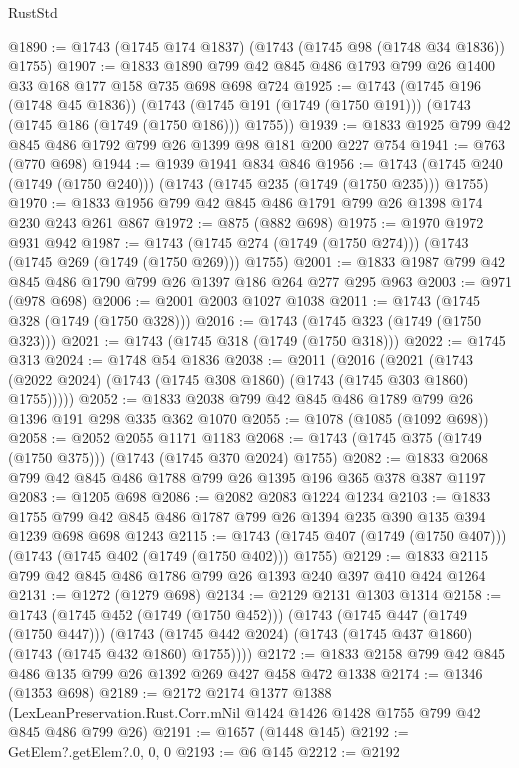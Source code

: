 \begin{lexlean}{RustStd}
\begin{coremodule}
@1890 := @1743 (@1745 @174 @1837) (@1743 (@1745 @98 (@1748 @34 @1836)) @1755)
@1907 := @1833 @1890 @799 @42 @845 @486 @1793 @799 @26 @1400 @33 @168 @177 @158 @735 @698 @698 @724
@1925 := @1743
    (@1745 @196 (@1748 @45 @1836))
    (@1743 (@1745 @191 (@1749 (@1750 @191))) (@1743 (@1745 @186 (@1749 (@1750 @186))) @1755))
@1939 := @1833 @1925 @799 @42 @845 @486 @1792 @799 @26 @1399 @98 @181 @200 @227 @754
@1941 := @763 (@770 @698)
@1944 := @1939 @1941 @834 @846
@1956 := @1743 (@1745 @240 (@1749 (@1750 @240))) (@1743 (@1745 @235 (@1749 (@1750 @235))) @1755)
@1970 := @1833 @1956 @799 @42 @845 @486 @1791 @799 @26 @1398 @174 @230 @243 @261 @867
@1972 := @875 (@882 @698)
@1975 := @1970 @1972 @931 @942
@1987 := @1743 (@1745 @274 (@1749 (@1750 @274))) (@1743 (@1745 @269 (@1749 (@1750 @269))) @1755)
@2001 := @1833 @1987 @799 @42 @845 @486 @1790 @799 @26 @1397 @186 @264 @277 @295 @963
@2003 := @971 (@978 @698)
@2006 := @2001 @2003 @1027 @1038
@2011 := @1743 (@1745 @328 (@1749 (@1750 @328)))
@2016 := @1743 (@1745 @323 (@1749 (@1750 @323)))
@2021 := @1743 (@1745 @318 (@1749 (@1750 @318)))
@2022 := @1745 @313
@2024 := @1748 @54 @1836
@2038 := @2011
    (@2016
      (@2021 (@1743 (@2022 @2024) (@1743 (@1745 @308 @1860) (@1743 (@1745 @303 @1860) @1755)))))
@2052 := @1833 @2038 @799 @42 @845 @486 @1789 @799 @26 @1396 @191 @298 @335 @362 @1070
@2055 := @1078 (@1085 (@1092 @698))
@2058 := @2052 @2055 @1171 @1183
@2068 := @1743 (@1745 @375 (@1749 (@1750 @375))) (@1743 (@1745 @370 @2024) @1755)
@2082 := @1833 @2068 @799 @42 @845 @486 @1788 @799 @26 @1395 @196 @365 @378 @387 @1197
@2083 := @1205 @698
@2086 := @2082 @2083 @1224 @1234
@2103 := @1833
    @1755
    @799
    @42
    @845
    @486
    @1787
    @799
    @26
    @1394
    @235
    @390
    @135
    @394
    @1239
    @698
    @698
    @1243
@2115 := @1743 (@1745 @407 (@1749 (@1750 @407))) (@1743 (@1745 @402 (@1749 (@1750 @402))) @1755)
@2129 := @1833 @2115 @799 @42 @845 @486 @1786 @799 @26 @1393 @240 @397 @410 @424 @1264
@2131 := @1272 (@1279 @698)
@2134 := @2129 @2131 @1303 @1314
@2158 := @1743
    (@1745 @452 (@1749 (@1750 @452)))
    (@1743
      (@1745 @447 (@1749 (@1750 @447)))
      (@1743 (@1745 @442 @2024) (@1743 (@1745 @437 @1860) (@1743 (@1745 @432 @1860) @1755))))
@2172 := @1833 @2158 @799 @42 @845 @486 @135 @799 @26 @1392 @269 @427 @458 @472 @1338
@2174 := @1346 (@1353 @698)
@2189 := @2172
    @2174
    @1377
    @1388
    (LexLeanPreservation.Rust.Corr.mNil @1424 @1426 @1428 @1755 @799 @42 @845 @486 @799 @26)
@2191 := @1657 (@1448 @145)
@2192 := GetElem?.getElem?.{0, 0, 0}
@2193 := @6 @145
@2212 := @2192

\end{coremodule}
\end{lexlean}
